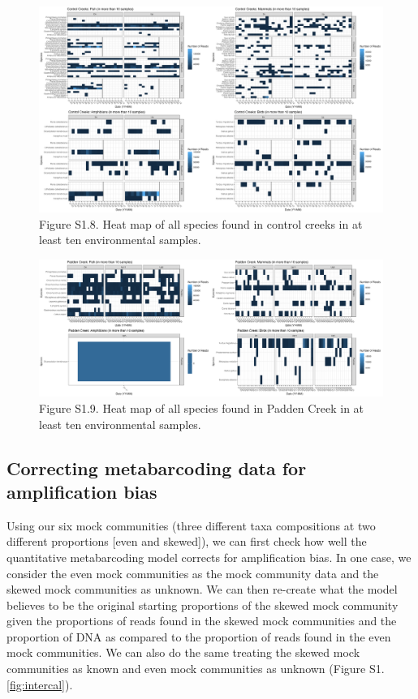 \documentclass[
]{article}
\begin{document}
\begin{figure}
\centering
\includegraphics{../Output/SupplementalFigures/ALLTAXA_controls.png}
\caption{Figure S1.8. Heat map of all species found in control creeks in
at least ten environmental samples.\label{fig:controlreads}}
\end{figure}

\begin{figure}
\centering
\includegraphics{../Output/SupplementalFigures/ALLTAXA_padden.png}
\caption{Figure S1.9. Heat map of all species found in Padden Creek in
at least ten environmental samples.\label{fig:paddenreads}}
\end{figure}

\hypertarget{correcting-metabarcoding-data-for-amplification-bias}{%
\subsection{Correcting metabarcoding data for amplification
bias}\label{correcting-metabarcoding-data-for-amplification-bias}}

Using our six mock communities (three different taxa compositions at two
different proportions {[}even and skewed{]}), we can first check how
well the quantitative metabarcoding model corrects for amplification
bias. In one case, we consider the even mock communities as the mock
community data and the skewed mock communities as unknown. We can then
re-create what the model believes to be the original starting
proportions of the skewed mock community given the proportions of reads
found in the skewed mock communities and the proportion of DNA as
compared to the proportion of reads found in the even mock communities.
We can also do the same treating the skewed mock communities as known
and even mock communities as unknown (Figure S1.\ref{fig:intercal}).
\end{document}
